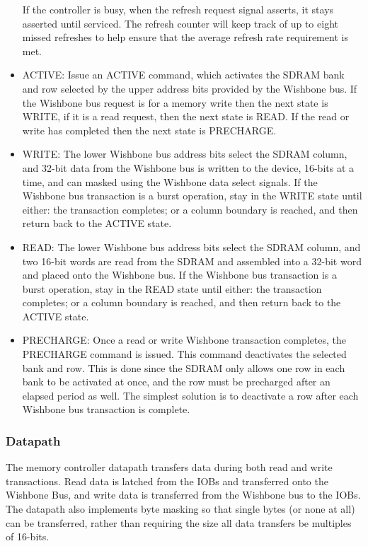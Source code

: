 \begin{itemize}
  If the controller is busy, when the refresh request signal asserts, it stays
  asserted until serviced. The refresh counter will keep track of up to eight
  missed refreshes to help ensure that the average refresh rate requirement is
  met.
  \item ACTIVE: Issue an ACTIVE command, which activates the SDRAM bank and row
  selected by the upper address bits provided by the Wishbone bus. If the
  Wishbone bus request is for a memory write then the next state is WRITE, if
  it is a read request, then the next state is READ. If the read or write has
  completed then the next state is PRECHARGE.
  \item WRITE: The lower Wishbone bus address bits select the SDRAM column,
  and 32-bit data from the Wishbone bus is written to the device, 16-bits at a
  time, and can masked using the Wishbone data select signals. If the Wishbone
  bus transaction is a burst operation, stay in the WRITE state until either: the
  transaction completes; or a column boundary is reached, and then return back
  to the ACTIVE state.
  \item READ: The lower Wishbone bus address bits select the SDRAM column,
  and two 16-bit words are read from the SDRAM and assembled into a
  32-bit word and placed onto the Wishbone bus. If the Wishbone bus transaction
  is a burst operation, stay in the READ state until either: the transaction
  completes; or a column boundary is reached, and then return back to the
  ACTIVE state.
  \item PRECHARGE: Once a read or write Wishbone transaction completes, the
  PRECHARGE command is issued. This command deactivates the selected bank
  and row. This is done since the SDRAM only allows one row in each bank to be
  activated at once, and the row must be precharged after an elapsed period
  as well. The simplest solution is to deactivate a row after each Wishbone bus
  transaction is complete.
\end{itemize}


\subsubsection{Datapath}
\label{MEM_Datapath}
The memory controller datapath transfers data during both read and write
transactions. Read data is latched from the IOBs and transferred onto the
Wishbone Bus, and write data is transferred from the Wishbone bus to the IOBs.
The datapath also implements byte masking so that single bytes (or none at all)
can be transferred, rather than requiring the size all data transfers be
multiples of 16-bits.

